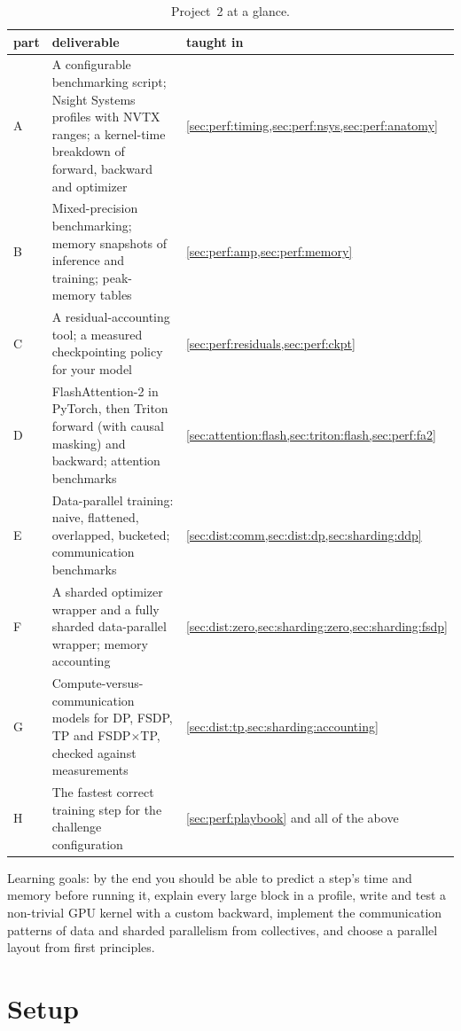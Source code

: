 \begin{table}[h]
\centering\small
\begin{tabularx}{\linewidth}{@{}lXl@{}}
\toprule
part & deliverable & taught in\\
\midrule
A & A configurable benchmarking script; Nsight Systems profiles with NVTX ranges; a kernel-time
    breakdown of forward, backward and optimizer & \cref{sec:perf:timing,sec:perf:nsys,sec:perf:anatomy}\\
B & Mixed-precision benchmarking; memory snapshots of inference and training; peak-memory
    tables & \cref{sec:perf:amp,sec:perf:memory}\\
C & A residual-accounting tool; a measured checkpointing policy for your model &
    \cref{sec:perf:residuals,sec:perf:ckpt}\\
D & FlashAttention-2 in PyTorch, then Triton forward (with causal masking) and backward;
    attention benchmarks & \cref{sec:attention:flash,sec:triton:flash,sec:perf:fa2}\\
E & Data-parallel training: naive, flattened, overlapped, bucketed; communication benchmarks &
    \cref{sec:dist:comm,sec:dist:dp,sec:sharding:ddp}\\
F & A sharded optimizer wrapper and a fully sharded data-parallel wrapper; memory accounting &
    \cref{sec:dist:zero,sec:sharding:zero,sec:sharding:fsdp}\\
G & Compute-versus-communication models for DP, FSDP, TP and FSDP$\times$TP, checked
    against measurements & \cref{sec:dist:tp,sec:sharding:accounting}\\
H & The fastest correct training step for the challenge configuration &
    \cref{sec:perf:playbook} and all of the above\\
\bottomrule
\end{tabularx}
\caption{Project~2 at a glance.}
\label{tab:proj2:parts}
\end{table}

Learning goals: by the end you should be able to predict a step's time and memory before running
it, explain every large block in a profile, write and test a non-trivial GPU kernel with a custom
backward, implement the communication patterns of data and sharded parallelism from collectives,
and choose a parallel layout from first principles.

\section{Setup}\label{sec:proj2:setup}

